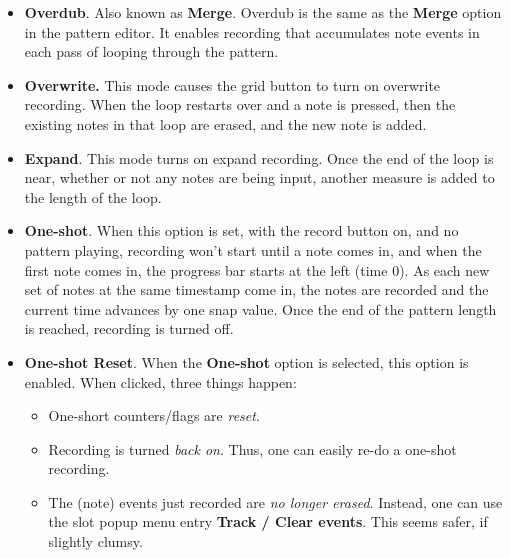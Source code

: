    \begin{itemize}
      \item \textbf{Overdub}.
         Also known as \textbf{Merge}.
         Overdub is the same as the \textbf{Merge} option in the 
         pattern editor.
         It enables recording that accumulates note events in each pass of
         looping through the pattern.
      \item \textbf{Overwrite.}
         This mode causes the grid button to turn on overwrite recording.
         When the loop restarts over and a note is pressed,
         then the existing notes in that loop are erased,
         and the new note is added.
      \item \textbf{Expand}.
         This mode turns on expand recording.
         Once the end of the loop is near, whether or
         not any notes are being input, another measure is added to the length
         of the loop.
      \item \textbf{One-shot}.
         When this option is set, with the record button on, and no pattern
         playing, recording won't start until a note comes in, and when the
         first note comes in, the progress bar starts at the left (time 0).
         As each new set of notes at the same timestamp come in, the
         notes are recorded and the current time advances by one snap value.
         Once the end of the pattern length is reached, recording is turned
         off.
      \item \textbf{One-shot Reset}.
         When the \textbf{One-shot} option is selected, this option
         is enabled.
         When clicked, three things happen:
         \begin{itemize}
            \item One-short counters/flags are \textsl{reset}.
            \item Recording is turned \textsl{back on}.
               Thus, one can easily re-do a one-shot recording.
            \item The (note) events just recorded are \textsl{no longer
            erased}. Instead, one can use the slot popup menu entry
            \textbf{Track / Clear events}.
            This seems safer, if slightly clumsy.
         \end{itemize}
   \end{itemize}

